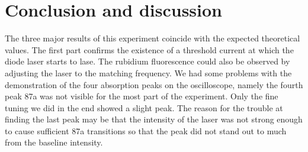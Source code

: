 \newpage
\section{Conclusion and discussion}
\label{sec:conclusion}
The three major results of this experiment coincide with the expected theoretical values.
The first part confirms the existence of a threshold current at which the diode laser starts to lase.
The rubidium fluorescence could also be observed by adjusting the laser to the matching frequency.
We had some problems with the demonstration of the four absorption peaks on the oscilloscope, namely the fourth peak 87a was not visible for the most part of the experiment.
Only the fine tuning we did in the end showed a slight peak.
The reason for the trouble at finding the last peak may be that the intensity of the laser was not strong enough to cause sufficient 87a transitions so that the peak did not stand out to much from the baseline intensity.
